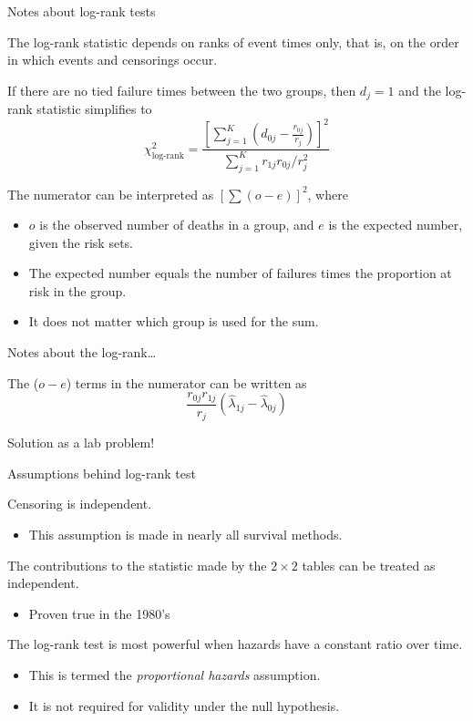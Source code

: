 \documentclass[ignorenonframetext,]{beamer}
\providecommand{\tightlist}{%
  \setlength{\itemsep}{0pt}\setlength{\parskip}{0pt}}
\begin{document}
\begin{frame}{%
\protect\hypertarget{notes-about-log-rank-tests}{%
Notes about log-rank tests}}

The log-rank statistic depends on ranks of event times only, that is, on
the order in which events and censorings occur.

If there are no tied failure times between the two groups, then
\(d_j=1\) and the log-rank statistic simplifies to
\[\chi^2_{\text{log-rank}}  =  \frac{[\sum_{j=1}^K (d_{0j} - \frac{r_{0j}}{r_j})]^2}
        {\sum_{j=1}^K r_{1j}r_{0j}/r_j^2}  \]

The numerator can be interpreted as \([\sum (o-e)]^2\), where

\begin{itemize}
\item
  \(o\) is the observed number of deaths in a group, and \(e\) is the
  expected number, given the risk sets.
\item
  The expected number equals the number of failures times the proportion
  at risk in the group.
\item
  It does not matter which group is used for the sum.
\end{itemize}

\end{frame}

\begin{frame}{%
\protect\hypertarget{notes-about-the-log-rank}{%
Notes about the log-rank\ldots}}

The (\(o-e\)) terms in the numerator can be written as
\[   \frac{r_{0j}r_{1j}}{r_j}(\widehat\lambda_{1j} - \widehat\lambda_{0j} ) \]

Solution as a lab problem!

\end{frame}

\begin{frame}{%
\protect\hypertarget{assumptions-behind-log-rank-test}{%
Assumptions behind log-rank test}}

Censoring is independent.

\begin{itemize}
\tightlist
\item
  This assumption is made in nearly all survival methods.
\end{itemize}

The contributions to the statistic made by the \(2 \times 2\) tables can
be treated as independent.

\begin{itemize}
\tightlist
\item
  Proven true in the 1980’s
\end{itemize}

The log-rank test is most powerful when hazards have a constant ratio
over time.

\begin{itemize}
\item
  This is termed the \emph{proportional hazards} assumption.
\item
  It is not required for validity under the null hypothesis.
\end{itemize}

\end{frame}
\end{document}
